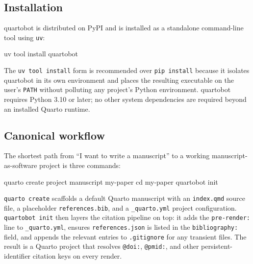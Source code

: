 \documentclass[
  letterpaper,
  DIV=11,
  numbers=noendperiod]{scrartcl}
\newenvironment{Shaded}{\begin{snugshade}}{\end{snugshade}}
\newcommand{\BuiltInTok}[1]{\textcolor[rgb]{0.00,0.23,0.31}{#1}}
\newcommand{\ExtensionTok}[1]{\textcolor[rgb]{0.00,0.23,0.31}{#1}}
\newcommand{\NormalTok}[1]{\textcolor[rgb]{0.00,0.23,0.31}{#1}}
\begin{document}
\subsection{Installation}\label{installation}

quartobot is distributed on PyPI and is installed as a standalone
command-line tool using \texttt{uv}:

\begin{Shaded}
\begin{Highlighting}[]
\ExtensionTok{uv}\NormalTok{ tool install quartobot}
\end{Highlighting}
\end{Shaded}

The \texttt{uv\ tool\ install} form is recommended over
\texttt{pip\ install} because it isolates quartobot in its own
environment and places the resulting executable on the user's
\texttt{PATH} without polluting any project's Python environment.
quartobot requires Python 3.10 or later; no other system dependencies
are required beyond an installed Quarto runtime.

\subsection{Canonical workflow}\label{canonical-workflow}

The shortest path from ``I want to write a manuscript'' to a working
manuscript-as-software project is three commands:

\begin{Shaded}
\begin{Highlighting}[]
\ExtensionTok{quarto}\NormalTok{ create project manuscript my{-}paper}
\BuiltInTok{cd}\NormalTok{ my{-}paper}
\ExtensionTok{quartobot}\NormalTok{ init}
\end{Highlighting}
\end{Shaded}

\texttt{quarto\ create} scaffolds a default Quarto manuscript with an
\texttt{index.qmd} source file, a placeholder \texttt{references.bib},
and a \texttt{\_quarto.yml} project configuration.
\texttt{quartobot\ init} then layers the citation pipeline on top: it
adds the \texttt{pre-render:} line to \texttt{\_quarto.yml}, ensures
\texttt{references.json} is listed in the \texttt{bibliography:} field,
and appends the relevant entries to \texttt{.gitignore} for any
transient files. The result is a Quarto project that resolves
\texttt{@doi:}, \texttt{@pmid:}, and other persistent-identifier
citation keys on every render.
\end{document}
